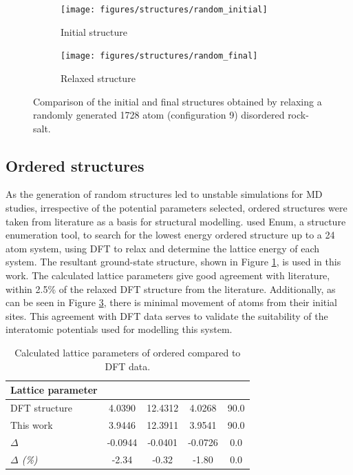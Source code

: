 \newpage
\begin{figure}[H]
\centering
 \begin{subfigure}{\textwidth}
 \centering
    \texttt{[image: figures/structures/random\_initial]}
    \caption{Initial structure}
    \label{fig:random_initial}
 \end{subfigure}
  \begin{subfigure}{\textwidth}
   \centering
    \texttt{[image: figures/structures/random\_final]}
    \caption{Relaxed structure}
    \label{fig:random_final}
 \end{subfigure}
\caption{Comparison of the initial and final structures obtained by relaxing a randomly generated 1728 atom (configuration 9)  disordered rock-salt.}
\label{fig:random}
\end{figure}

\newpage
\subsection{Ordered structures}
\label{sec:ordered}
As the generation of random structures led to unstable simulations for MD studies, irrespective of the potential parameters selected, ordered structures were taken from literature as a basis for structural modelling.
\citet{Diaz-Lopez2017} used Enum, a structure enumeration tool, to search for the lowest energy ordered  structure up to a 24 atom system, using DFT to relax and determine the lattice energy of each system.
The resultant ground-state structure, shown in Figure \ref{fig:random_initial}, is used in this work.
The calculated lattice parameters give good agreement with literature, within 2.5\% of the relaxed DFT structure from the literature.
Additionally, as can be seen in Figure \ref{fig:random}, there is minimal movement of atoms from their initial sites.
This agreement with DFT data serves to validate the suitability of the interatomic potentials used for modelling this system.
\vfill
\begin{table}[h]
\centering
\caption{Calculated lattice parameters of ordered  compared to DFT data.}
\begin{tabular}{lS[table-format=4.4]S[table-format=4.4]S[table-format=4.4]S[table-format=2.1]}
\toprule
\textbf{Lattice parameter} &   &  & &\mc{$\boldsymbol{\alpha} = \boldsymbol{\beta} = \boldsymbol{\gamma}$ (\si{\degree})}\\
\midrule
DFT structure \cite{Diaz-Lopez2017} &  4.0390  & 12.4312 &  4.0268 & 90.0 \\
This work                           &  3.9446  & 12.3911 &  3.9541 & 90.0 \\ 
\textit{$\Delta$}                   & -0.0944  & -0.0401 & -0.0726 &  0.0 \\
\textit{$\Delta$ (\%)}              & -2.34    & -0.32   & -1.80   &  0.0 \\ \bottomrule
\end{tabular}
\end{table}
\vspace{0.25\textheight}

